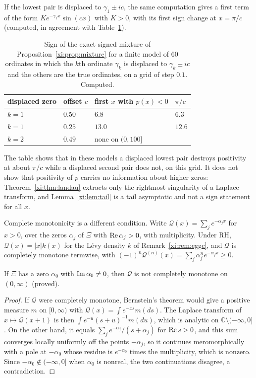 If the lowest pair is displaced to $\gamma_1\pm ic$, the same computation gives a first term of the form $Ke^{-\gamma_1x}\sin(cx)$ with $K>0$, with its first sign change at $x=\pi/c$ (computed, in agreement with Table~\ref{xi:tab:density}).

\begin{table}[htbp]
\centering\small
\begin{tabular}{@{}llll@{}}
\toprule
displaced zero & offset $c$ & first $x$ with $p(x)<0$ & $\pi/c$\\
\midrule
$k=1$ & $0.50$ & $6.8$ & $6.3$\\
$k=1$ & $0.25$ & $13.0$ & $12.6$\\
$k=2$ & $0.49$ & none on $(0,100]$ & \\
\bottomrule
\end{tabular}
\caption{Sign of the exact signed mixture of Proposition~\ref{xi:prop:mixture} for a finite model of $60$ ordinates in which the $k$th ordinate $\gamma_k$ is displaced to $\gamma_k\pm ic$ and the others are the true ordinates, on a grid of step $0.1$. Computed.}
\label{xi:tab:density}
\end{table}

The table shows that in these models a displaced lowest pair destroys positivity at about $\pi/c$ while a displaced second pair does not, on this grid. It does not show that positivity of $p$ carries no information about higher zeros: Theorem~\ref{xi:thm:landau} extracts only the rightmost singularity of a Laplace transform, and Lemma~\ref{xi:lem:tail} is a tail asymptotic and not a sign statement for all $x$.

Complete monotonicity is a different condition. Write $\mathcal Q(x)=\sum_je^{-\alpha_jx}$ for $x>0$, over the zeros $\alpha_j$ of $\Xi$ with $\operatorname{Re}\alpha_j>0$, with multiplicity. Under RH, $\mathcal Q(x)=|x|k(x)$ for the L\'evy density $k$ of Remark~\ref{xi:rem:eggc}, and $\mathcal Q$ is completely monotone termwise, with $(-1)^n\mathcal Q^{(n)}(x)=\sum_j\alpha_j^ne^{-\alpha_jx}\ge0$.

\begin{proposition}\label{xi:prop:sharp}
If $\Xi$ has a zero $\alpha_0$ with $\operatorname{Im}\alpha_0\ne0$, then $\mathcal Q$ is not completely monotone on $(0,\infty)$ (proved).
\end{proposition}

\begin{proof}
If $\mathcal Q$ were completely monotone, Bernstein's theorem would give a positive measure $m$ on $[0,\infty)$ with $\mathcal Q(x)=\int e^{-xs}m(ds)$. The Laplace transform of $x\mapsto\mathcal Q(x+1)$ is then $\int e^{-u}(s+u)^{-1}m(du)$, which is analytic on $\mathbb C\setminus(-\infty,0]$. On the other hand, it equals $\sum_je^{-\alpha_j}/(s+\alpha_j)$ for $\operatorname{Re} s>0$, and this sum converges locally uniformly off the points $-\alpha_j$, so it continues meromorphically with a pole at $-\alpha_0$ whose residue is $e^{-\alpha_0}$ times the multiplicity, which is nonzero. Since $-\alpha_0\notin(-\infty,0]$ when $\alpha_0$ is nonreal, the two continuations disagree, a contradiction.
\end{proof}

